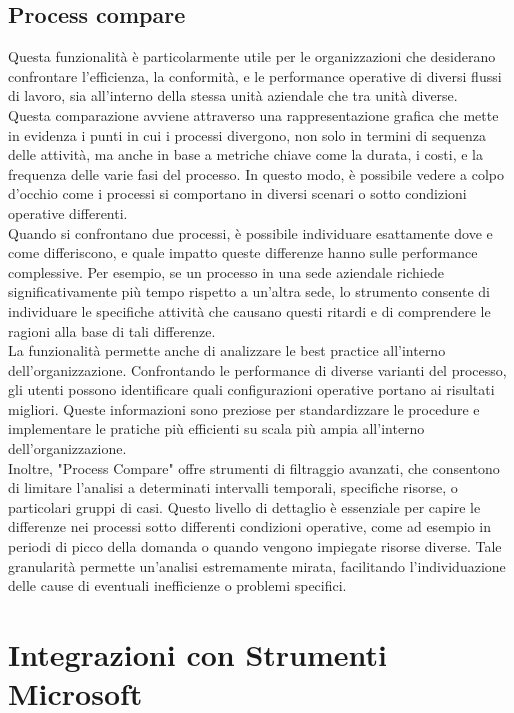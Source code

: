 \documentclass{article}
\begin{document}
\subsection{Process compare}
Questa funzionalità è particolarmente utile per le organizzazioni che desiderano confrontare l'efficienza, la conformità, e le performance operative di diversi flussi di lavoro, sia all'interno della stessa unità aziendale che tra unità diverse.\\
Questa comparazione avviene attraverso una rappresentazione grafica che mette in evidenza i punti in cui i processi divergono, non solo in termini di sequenza delle attività, ma anche in base a metriche chiave come la durata, i costi, e la frequenza delle varie fasi del processo. In questo modo, è possibile vedere a colpo d’occhio come i processi si comportano in diversi scenari o sotto condizioni operative differenti.\\
Quando si confrontano due processi, è possibile individuare esattamente dove e come differiscono, e quale impatto queste differenze hanno sulle performance complessive. Per esempio, se un processo in una sede aziendale richiede significativamente più tempo rispetto a un'altra sede, lo strumento consente di individuare le specifiche attività che causano questi ritardi e di comprendere le ragioni alla base di tali differenze.\\
La funzionalità permette anche di analizzare le best practice all'interno dell’organizzazione. Confrontando le performance di diverse varianti del processo, gli utenti possono identificare quali configurazioni operative portano ai risultati migliori. Queste informazioni sono preziose per standardizzare le procedure e implementare le pratiche più efficienti su scala più ampia all'interno dell'organizzazione.\\
Inoltre, "Process Compare" offre strumenti di filtraggio avanzati, che consentono di limitare l'analisi a determinati intervalli temporali, specifiche risorse, o particolari gruppi di casi. Questo livello di dettaglio è essenziale per capire le differenze nei processi sotto differenti condizioni operative, come ad esempio in periodi di picco della domanda o quando vengono impiegate risorse diverse. Tale granularità permette un'analisi estremamente mirata, facilitando l'individuazione delle cause di eventuali inefficienze o problemi specifici.

\section{Integrazioni con Strumenti Microsoft}
\end{document}
